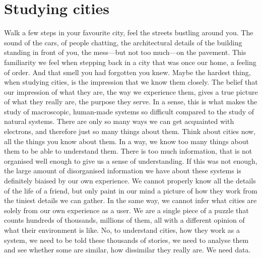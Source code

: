 \chapter{Studying cities}
\label{sec:studying_cities}

Walk a few steps in your favourite city, feel the streets bustling around you.
The sound of the cars, of people chatting, the architectural details of the
building standing in front of you, the mess---but not too much---on the
pavement. This familiarity we feel when stepping back in a city that was once
our home, a feeling of order. And that smell you had forgotten you knew. Maybe
the hardest thing, when studying cities, is the impression that we know them
closely. The belief that our impression of what they are, the way we experience
them, gives a true picture of what they really are, the purpose they serve. In a
sense, this is what makes the study of macroscopic, human-made systems so
difficult compared to the study of natural systems. There are only so many ways
we can get acquainted with electrons, and therefore just so many things about
them. Think about cities now, all the things you know about them. In a way, we
know too many things about them to be able to understand them. There is too much
information, that is not organised well enough to give us a sense of
understanding. If this was not enough, the large amount of disorganised
information we have about these systems is definitely biaised by our own
experience. We cannot properly know all the details of the life of a friend,
but only paint in our mind a picture of how they work from the tiniest details
we can gather. In the same way, we cannot infer what cities are solely from our
own experience as a user. We are a single piece of a puzzle that counts hundreds
of thousands, millions of them, all with a different opinion of what their
environment is like. No, to understand cities, how they work as a system, we
need to be told these thousands of stories, we need to analyse them and see
whether some are similar, how dissimilar they really are. We need data.\\

